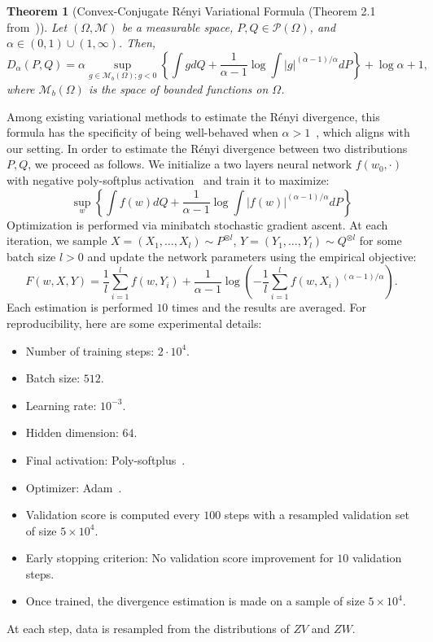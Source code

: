 \documentclass{article}
\theoremstyle{plain}
\newtheorem{theorem}{Theorem}[section]
\theoremstyle{definition}
\theoremstyle{remark}
\begin{document}
\begin{theorem}[Convex-Conjugate Rényi Variational Formula (Theorem 2.1 from~\citep{birrell2023})]
Let $(\Omega, \mathcal{M})$ be a measurable space, $P, Q \in \mathcal{P}(\Omega)$, and $\alpha \in (0,1) \cup (1,\infty)$. Then,
\[D_\alpha(P,Q) =\alpha \sup_{g \in \mathcal{M}_b(\Omega); g < 0} \left\{ \int gdQ + \frac{1}{\alpha - 1} \log \int |g|^{(\alpha-1)/\alpha} dP \right\} + \log \alpha + 1,\]
where $\mathcal{M}_b(\Omega)$ is the space of bounded functions on $\Omega$.
\end{theorem}

Among existing variational methods to estimate the Rényi divergence, this formula has the specificity of being well-behaved when $\alpha > 1$~\citep{birrell2023}, which aligns with our setting. In order to estimate the Rényi divergence between two distributions $P,Q$, we proceed as follows. We initialize a two layers neural network $f(w_0,\cdot)$ with negative poly-softplus activation~\citep{birrell2023} and train it to maximize:
\[\sup_{w} \left\{ \int f(w)dQ + \frac{1}{\alpha - 1} \log \int |f(w)|^{(\alpha-1)/\alpha} dP \right\}\]
Optimization is performed via minibatch stochastic gradient ascent. At each iteration, we sample $X = (X_1,\dots, X_l) \sim P^{\otimes l}$, $Y = (Y_1,\dots,Y_l) \sim Q^{\otimes l}$ for some batch size $l > 0$ and update the network parameters using the empirical objective:
\[F(w,X,Y) =\frac{1}{l}\sum_{i=1}^lf(w,Y_i)+  \frac{1}{
\alpha - 1}\log\left( -\frac{1}{l}\sum_{i=1}^l f(w,X_i)^{(\alpha-1)/\alpha}\right).\]
Each estimation is performed $10$ times and the results are averaged. For reproducibility, here are some experimental details:
\begin{itemize}
    \item Number of training steps: $2\cdot 10^4$.
    \item Batch size: $512$.
    \item Learning rate: $10^{-3}$.
    \item Hidden dimension: $64$.
    \item Final activation: Poly-softplus~\citep{birrell2023}.
    \item Optimizer: Adam~\citep{Kingma2014}.
    \item Validation score is computed every $100$ steps with a resampled validation set of size $5 \times 10^4$.
    \item Early stopping criterion: No validation score improvement for $10$ validation steps.
    \item Once trained, the divergence estimation is made on a sample of size $5 \times 10^4$.
\end{itemize}
At each step, data is resampled from the distributions of $ZV$ and $ZW$.
\end{document}
